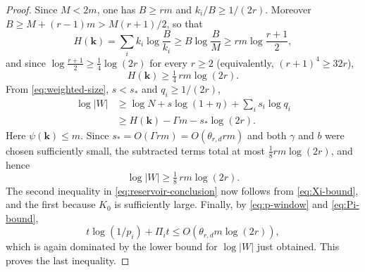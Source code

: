 \documentclass[11pt]{article}
\theoremstyle{definition}
\newcommand{\kk}{\mathbf k}
\newcommand{\Ent}{H}
\newcommand{\pot}{\psi}
\begin{document}
\begin{proof}
Since $M<2m$, one has $B\ge rm$ and $k_i/B\ge1/(2r)$.  Moreover
$B\ge M+(r-1)m>M(r+1)/2$, so that
\[
 \Ent(\kk)=\sum_ik_i\log\frac B{k_i}
 \ge B\log\frac BM
 \ge rm\log\frac{r+1}2,
\]
and since $\log\frac{r+1}2\ge\tfrac14\log(2r)$ for every $r\ge2$
(equivalently, $(r+1)^4\ge32r$),
\[
 \Ent(\kk)\ge\tfrac14\,rm\log(2r).
\]
From \eqref{eq:weighted-size}, $s<s_\ast$ and $q_i\ge1/(2r)$,
\begin{align*}
 \log|W|
 &\ge \log N+s\log(1+\eta)+\sum_i s_i\log q_i\\
 &\ge \Ent(\kk)-\Gamma m-s_\ast\log(2r).
\end{align*}
Here $\pot(\kk)\le m$.  Since
$s_\ast=O(\Gamma rm)=O(\theta_{r,d}rm)$ and both $\gamma$ and $b$ were chosen
sufficiently small, the subtracted terms total at most
$\tfrac18rm\log(2r)$, and hence
\[
 \log|W|\ge\tfrac18\,rm\log(2r).
\]
The second inequality in \eqref{eq:reservoir-conclusion} now follows from
\eqref{eq:Xi-bound}, and the first because $K_0$ is sufficiently large.  Finally, by \eqref{eq:p-window} and \eqref{eq:Pi-bound},
\[
 t\log(1/p_i)+\Pi_it
 \le O(\theta_{r,d}m\log(2r)),
\]
which is again dominated by the lower bound for $\log|W|$ just obtained.
This proves the last inequality.
\end{proof}
\end{document}
